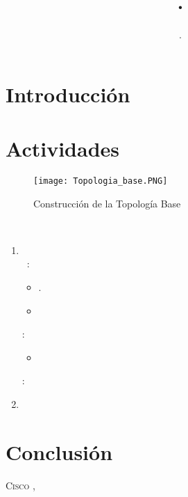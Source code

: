 \documentclass{udpreport}
\title{. }
\author{.}
\date{}
\begin{document}
\maketitle
\tableofcontents
\listoffigures
\chapter{Introducción}
  
\chapter{Actividades}
	
	\begin{figure}[H]
	\centering
	\texttt{[image: Topologia\_base.PNG]}
	\caption{Construcción de la Topología Base}
	\end{figure}
	\newpage
	\
{\large \bf{ }}
	\begin{enumerate}
	    \item \\\
	    \underline {}:\\
	    
	    \begin{itemize}
	    	\item .
	    \end{itemize}
	   
	    \begin{itemize}
	    	\item 
	    \end{itemize}
	    \underline{}:\\
	    
	    \begin{itemize}
	    
	    
	    	\item 
	    \end{itemize}
	  :
	    \begin{itemize}
	    	
	    \end{itemize}
            \item 
  	     
	\end{enumerate}
	
    
	
\chapter{Conclusión}

\begin{thebibliography}{x}
 \textsc{Cisco },
\textit{}

\end{thebibliography}
\end{document}
